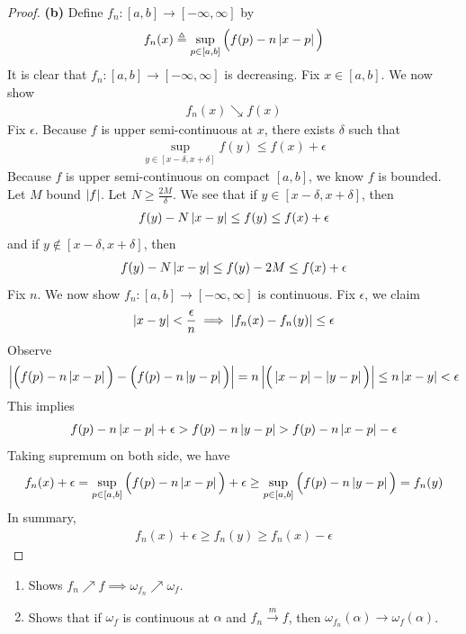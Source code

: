 \documentclass{report}
\begin{document}
\begin{proof}
\textbf{(b)} Define  $f_n:[a,b]\rightarrow [-\infty,\infty]$ by  
\begin{align*}
f_n(x)\triangleq \sup_{p \in [a,b]}\Big(f(p)-n\left|x-p\right| \Big)
\end{align*}
It is clear that $f_n:[a,b]\rightarrow [-\infty,\infty]$ is decreasing. Fix $x \in [a,b]$. We now show 
\begin{align*}
f_n(x)\searrow f(x)
\end{align*}
Fix $\epsilon $. Because $f$ is upper semi-continuous at  $x$, there exists  $\delta$ such that 
\begin{align*}
\sup_{y \in [x-\delta, x+\delta]} f(y)\leq f(x)+ \epsilon 
\end{align*}
Because $f$ is upper semi-continuous on compact $[a,b]$, we know $f$ is bounded. Let $M$ bound  $\left|f\right|$. Let $N\geq \frac{2M}{\delta}$. We see that if $y \in [x-\delta,x+\delta]$, then 
\begin{align*}
f(y)- N \left|x-y\right| \leq  f(y) \leq f(x)+ \epsilon 
\end{align*}
and if $y \not\in [x-\delta,x+\delta]$, then 
\begin{align*}
f(y)- N \left|x-y\right|\leq f(y)-2M \leq f(x)+ \epsilon 
\end{align*}
Fix $n$. We now show  $f_n:[a,b]\rightarrow [-\infty,\infty]$ is continuous. Fix $\epsilon $, we claim 
\begin{align*}
\left|x-y\right|< \frac{\epsilon }{n} \implies \left|f_n(x)-f_n(y)\right|\leq \epsilon 
\end{align*}
Observe 
\begin{align*}
\left|\Big(f(p)-n \left|x-p\right| \Big)- \Big( f(p)-n\left|y-p\right| \Big)\right|= n \left|\Big(\left|x-p\right|-\left|y-p\right| \Big)\right|\leq n \left|x-y\right|< \epsilon 
\end{align*}
This implies 
\begin{align*}
f(p)-n\left| x-p\right|+\epsilon > f(p)-n \left|y-p\right| >f(p)-n \left|x-p\right|-\epsilon 
\end{align*}
Taking supremum on both side, we have  
\begin{align*}
f_n(x)+\epsilon =\sup_{p \in [a,b]} \Big(f(p)-n\left|x-p\right| \Big)+\epsilon \geq \sup_{p\in [a,b]} \Big( f(p)-n\left|y-p\right| \Big)=f_n(y)
\end{align*}
In summary, 
\begin{align*}
f_n(x)+\epsilon \geq f_n(y) \geq f_n(x)-\epsilon 
\end{align*}
\end{proof}
\begin{question}{}{}
\begin{enumerate}[label=(\alph*)]
  \item Shows $f_n\nearrow f \implies  \omega_{f_n}\nearrow \omega_f$. 
  \item Shows that if $\omega_f$ is continuous at $\alpha $ and $f_n \overset{m}{\to}f$, then $\omega_{f_n}(\alpha ) \to \omega_f (\alpha )$. 
\end{enumerate}
\end{question}
\end{document}
